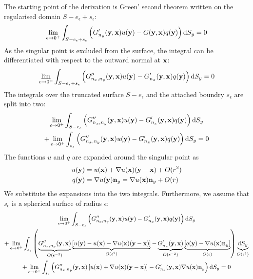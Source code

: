 \documentclass[a4paper,11pt]{article}
\newcommand{\td}{\mathrm{d}}
\begin{document}
The starting point of the derivation is Green' second theorem written on the regularised domain $S-e_{\epsilon}+s_{\epsilon}$:
%
\begin{equation}
\lim_{\epsilon \to 0^+}
\int_{S-e_{\epsilon}+s_{\epsilon}}
\left(
G'_{n_y}({\bf y}, {\bf x}) u({\bf y}) - G({\bf y}, {\bf x}) q({\bf y})
\right) 
\td S_y = 0
\end{equation}
%
As the singular point is excluded from the surface, the integral can be differentiated with respect to the outward normal at ${\bf x}$:
%
\begin{equation}
\lim_{\epsilon \to 0^+}
\int_{S-e_{\epsilon}+s_{\epsilon}}
\left(
G''_{n_x,n_y}({\bf y}, {\bf x}) u({\bf y}) - G'_{n_x}({\bf y}, {\bf x}) q({\bf y})
\right)
\td S_y = 0
\end{equation}
%
The integrals over the truncated surface $S-e_{\epsilon}$ and the attached boundry $s_{\epsilon}$ are split into two:
%
\begin{multline}
\lim_{\epsilon \to 0^+}
\int_{S-e_{\epsilon}}
\left(
G''_{n_x,n_y}({\bf y}, {\bf x}) u({\bf y}) - G'_{n_x}({\bf y}, {\bf x}) q({\bf y})
\right)
\td S_y
\\
+
\lim_{\epsilon \to 0^+}
\int_{s_{\epsilon}}
\left(
G''_{n_x,n_y}({\bf y}, {\bf x}) u({\bf y}) - G'_{n_x}({\bf y}, {\bf x}) q({\bf y})
\right)
\td S_y = 0
\end{multline}
%
The functions $u$ and $q$ are expanded around the singular point as
%
\begin{align}
u({\bf y}) &= u({\bf x}) + \nabla u({\bf x}) ({\bf y} - {\bf x}) + O(r^2) \nonumber \\
q({\bf y}) &= \nabla u({\bf y}) {\bf n}_y = \nabla u({\bf x}) {\bf n}_y + O(r)
\end{align}
%
We substitute the expansions into the two integrals. Furthermore, we assume that $s_{\epsilon}$ is a spherical surface of radius $\epsilon$:
%
\begin{multline}
\lim_{\epsilon \to 0^+}
\int_{S-e_{\epsilon}}
\left(
G''_{n_x,n_y}({\bf y}, {\bf x}) u({\bf y})
- G'_{n_x}({\bf y}, {\bf x}) q({\bf y})
\right)
\td S_y
\\
+
\lim_{\epsilon \to 0^+}
\int_{s_{\epsilon}}
\left(
\underbrace{G''_{n_x,n_y}({\bf y}, {\bf x})}_{O(\epsilon^{-3})} \underbrace{\left[u({\bf y}) - u({\bf x}) - \nabla u({\bf x}) ({\bf y} - {\bf x})\right]}_{O(\epsilon^2)}
- \underbrace{G'_{n_x}({\bf y}, {\bf x})}_{O(\epsilon^{-2})} \underbrace{\left[q({\bf y}) - \nabla u({\bf x}) {\bf n}_y\right]}_{O(\epsilon)}
\right)
\underbrace{\td S_y}_{O(\epsilon^2)}
\\
+
\lim_{\epsilon \to 0^+}
\int_{s_{\epsilon}}
\left(
G''_{n_x,n_y}({\bf y}, {\bf x}) \left[u({\bf x}) + \nabla u({\bf x}) ({\bf y} - {\bf x})\right]
- G'_{n_x}({\bf y}, {\bf x}) \nabla u({\bf x}) {\bf n}_y
\right)
\td S_y = 0
\end{multline}
\end{document}
